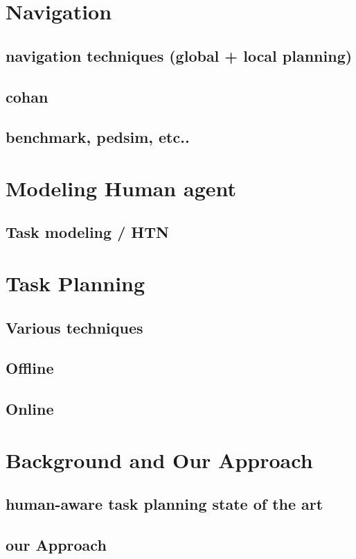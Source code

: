 \section{Navigation}

\subsection{navigation techniques (global + local planning)}
\subsection{cohan}
\subsection{benchmark, pedsim, etc..}


\section{Modeling Human agent}
\subsection{Task modeling / HTN}

\section{Task Planning}

\subsection{Various techniques}
\subsection{Offline}
\subsection{Online}


\section{Background and Our Approach}
\subsection{human-aware task planning state of the art}
\subsection{our Approach}


